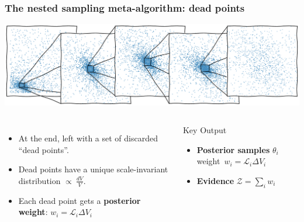\documentclass[aspectratio=169]{beamer}
\begin{document}
\begin{frame}
    \frametitle{The nested sampling meta-algorithm: dead points}
    \includegraphics[width=\textwidth]{figures/dead_measure}
    \begin{columns}
        \begin{itemize}
            \item At the end, left with a set of discarded ``dead points''.
            \item Dead points have a unique scale-invariant distribution $\propto\: \tfrac{dV}{V}$.
            \item Each dead point gets a \textbf{posterior weight}: $w_i = \mathcal{L}_i \Delta V_i$
        \end{itemize}
        \begin{block}{Key Output}
        \begin{itemize}
            \item \textbf{Posterior samples} $\theta_i$ weight~$w_i=\mathcal{L}_i \Delta V_i$
            \item \textbf{Evidence} $\mathcal{Z} = \sum_i w_i$
        \end{itemize}
        \end{block}
    \end{columns}
\end{frame}
\end{document}
